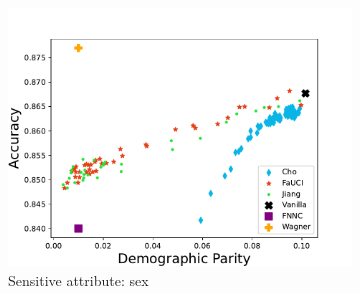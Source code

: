 
\newcommand{\onethirdsize}{0.32\linewidth}

\begin{figure}%
    \centering
    \caption{%
        Experiments comparing \gls{FaUCI} to related works, using different (variants of) the \gls{DP}, \gls{DI}, and \gls{EO} fairness metrics.
        Each row corresponds to a different fairness metric (\gls{DP}, \gls{DI}, and \gls{EO}).
        Each column corresponds to a different variant of the fairness metric (normal, for binary attributes, weighted for categorical attributes, and generalised for continuous attributes).
        Each dot of each chart is the average of 5 runs (5-folds cross-validation).
        In each chart, red stars represent \gls{FaUCI}, blue diamonds Cho's method, green dots Jiang's method and the black cross the vanilla neural network (i.e., the \gls{NN} without fairness constraints).
        For \gls{FNNC} and \gls{LTN} we were not able to reproduce experiments, so we report the results as reported by the authors---which implies only one dot per chart.
    }
    \begin{subfigure}[]{\onethirdsize}
        \centering
        \includegraphics[width=\columnwidth]{figures/fauci/accuracy/demographic_parity_sex}
        \caption{Sensitive attribute: sex}
        \label{fig:dp-sex}
    \end{subfigure}
    \begin{subfigure}[]{\onethirdsize}
        \centering

\end{subfigure}
\end{figure}
